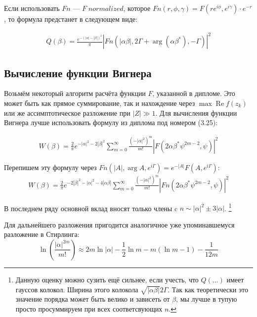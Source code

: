 \documentclass[a4paper, 12pt]{article}
\DeclareMathOperator*{\Real}{Re}
\begin{document}
Если использовать $Fn$ --- $F\; normalized$, которое $Fn(r, \phi, \gamma) = F(r e^{i\phi}, e^{i\gamma}) \cdot e^{-r}$, то формула предстанет в следующем виде:

\begin{equation}
\begin{aligned}
    Q(\beta) = \frac{e^{-\left(|\alpha|-|\beta|\right)^2}}{\pi}\left|Fn(|\alpha\beta|, 2 \Gamma + \arg\left(\alpha\beta^*\right), -\Gamma)\right|^2
\end{aligned}
\end{equation}

\subsection*{Вычисление функции Вигнера}
Возьмём некоторый алгоритм расчёта функции $F$, указанной в дипломе. Это может быть как прямое суммирование, так и нахождение через $\max \Real f(z_k)$ или же ассимптотическое разложение при $|Z|\gg 1$. Для вычисления функции Вигнера лучше использовать формулу из диплома под номером (3.25):

\begin{equation}\label{FtoWrow}
	\begin{aligned}
		W(\beta) = \frac{2}{\pi}e^{-|\alpha|^2-2|\beta|^2}\sum\limits_{m=0}^{\infty} \frac{\left(-|\alpha|^2\right)^m}{m!}\left|F(2\alpha \beta^*\psi^{2m-2}, \psi)\right|^2
	\end{aligned}
\end{equation}

Перепишем эту формулу через $Fn(|A|, \arg A, e^{i\Gamma}) = e^{-|A|}F(A, e^{i\Gamma})$:
\begin{equation}
	\begin{aligned}
		W(\beta) = \frac{2}{\pi}e^{-2|\beta|^2 -|\alpha|^2 - 4|\alpha\beta|}\sum\limits_{m=0}^{\infty} \frac{\left(-|\alpha|^2\right)^m}{m!}\left|Fn(2\alpha \beta^*\psi^{2m-2}, \psi)\right|^2
	\end{aligned}
\end{equation}

В последнем ряду основной вклад вносят только члены c $n\sim|\alpha|^2 \pm 3|\alpha|$.
\footnote{Данную оценку можно сузить ещё сильнее, если учесть, что $Q(\dots)$ имеет гауссов колокол. Ширина этого колокола $\sqrt{|\alpha\beta|}2\Gamma$. Так как теоретически это значение порядка может быть велико и зависеть  от $\beta$, мы лучше в тупую просто просуммируем при всех соответсвующих $n$.}

Для дальнейшего разложения пригодится аналогичное уже упоминавшемуся разложение в Стирлинга:
\begin{equation}
    \ln\left(\frac{|\alpha|^{2m}}{m!}\right)\approx 2m \ln|\alpha| - \frac{1}{2}\ln m - m \left(\ln m - 1\right) - \frac{1}{12m}
\end{equation}
\end{document}
